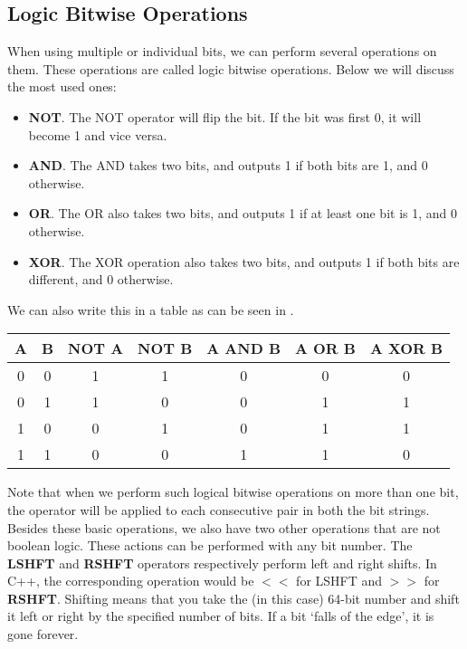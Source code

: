 \subsection{Logic Bitwise Operations}
When using multiple or individual bits, we can perform several operations on them. 
These operations are called logic bitwise operations.
Below we will discuss the most used ones:
%
\begin{itemize}
	\item \textbf{NOT}. The NOT operator will flip the bit. If the bit was first 0, it will become 1 and vice versa.
	\item \textbf{AND}. The AND takes two bits, and outputs 1 if both bits are 1, and 0 otherwise.
	\item \textbf{OR}. The OR also takes two bits, and outputs 1 if at least one bit is 1, and 0 otherwise.
	\item \textbf{XOR}. The XOR operation also takes two bits, and outputs 1 if both bits are different, and 0 otherwise.
\end{itemize}
%
We can also write this in a table as can be seen in .
%
\begin{table}[H]
	\centering
	\begin{tabular}{c|c|c|c|c|c|c}
		\textbf{A} & \textbf{B} & \textbf{NOT A} & \textbf{NOT B} & \textbf{A AND B} & \textbf{A OR B} & \textbf{A XOR B}\\ \hline
		0 & 0 & 1 & 1 & 0 & 0 & 0\\
		0 &	1 & 1 & 0 & 0 & 1 & 1\\
		1 & 0 & 0 & 1 & 0 & 1 & 1\\
		1 & 1 & 0 & 0 & 1 & 1 & 0\\
	\end{tabular}
	\label{table: logical bitwise operations}
\end{table}
%
Note that when we perform such logical bitwise operations on more than one bit, the operator will be applied to each consecutive pair in both the bit strings.
Besides these basic operations, we also have two other operations that are not boolean logic.
These actions can be performed with any bit number.
The \textbf{LSHFT} and \textbf{RSHFT} operators respectively perform left and right shifts.
In C++, the corresponding operation would be $<<$ for LSHFT and $>>$ for \textbf{RSHFT}. 
Shifting means that you take the (in this case) 64-bit number and shift it left or right by the specified number of bits. 
If a bit `falls of the edge', it is gone forever. 
